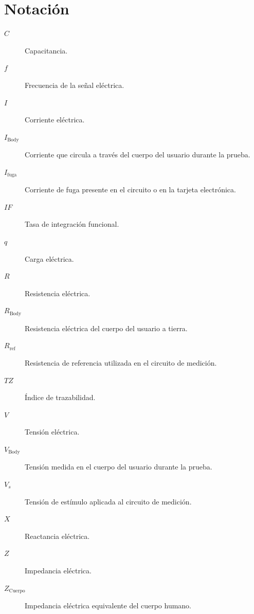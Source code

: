 \chapter*{Notación}

\begin{description}

\item[$C$] Capacitancia.

\item[$f$] Frecuencia de la señal eléctrica.

\item[$I$] Corriente eléctrica.

\item[$I_{\mathrm{Body}}$] Corriente que circula a través del cuerpo del usuario durante la prueba.

\item[$I_{\mathrm{fuga}}$] Corriente de fuga presente en el circuito o en la tarjeta electrónica.

\item[$IF$] Tasa de integración funcional.

\item[$q$] Carga eléctrica.

\item[$R$] Resistencia eléctrica.

\item[$R_{\mathrm{Body}}$] Resistencia eléctrica del cuerpo del usuario a tierra.

\item[$R_{\mathrm{ref}}$] Resistencia de referencia utilizada en el circuito de medición.

\item[$TZ$] Índice de trazabilidad.

\item[$V$] Tensión eléctrica.

\item[$V_{\mathrm{Body}}$] Tensión medida en el cuerpo del usuario durante la prueba.

\item[$V_s$] Tensión de estímulo aplicada al circuito de medición.

\item[$X$] Reactancia eléctrica.

\item[$Z$] Impedancia eléctrica.

\item[$Z_{\mathrm{Cuerpo}}$] Impedancia eléctrica equivalente del cuerpo humano.

\end{description}
